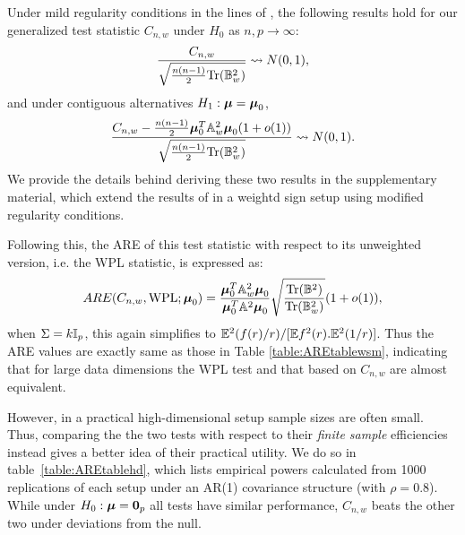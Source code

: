 Under mild regularity conditions in the lines of \cite{WangPengLi15}, the following results hold for our generalized test statistic $C_{n,w}$ under $H_0$ as $n,p \rightarrow \infty$:
%
\begin{equation}\label{eqn:hdtest1}
\frac{C_{n,w}}{\sqrt{\frac{n(n-1)}{2} \text{Tr}({\mathbb{B}}_w^2)}} \leadsto N(0,1),
\end{equation}
%
and under contiguous alternatives $H_1: {\boldsymbol{\mu}} = {\boldsymbol{\mu}}_0$,
%
\begin{equation}\label{eqn:hdtest2}
\frac{C_{n,w} - \frac{n(n-1)}{2} {\boldsymbol{\mu}}_0^T {\mathbb{A}}_w^2 {\boldsymbol{\mu}}_0 (1 + o(1)) }{\sqrt{\frac{n(n-1)}{2} \text{Tr}({\mathbb{B}}_w^2)}} \leadsto N(0,1).
\end{equation}
%
We provide the details behind deriving these two results in the supplementary material, which extend the results of \cite{WangPengLi15} in a weightd sign setup using modified regularity conditions.

Following this, the ARE of this test statistic with respect to its unweighted version, i.e. the WPL statistic, is expressed as:
%
$$
ARE(C_{n,w}, \text{WPL}; {\boldsymbol{\mu}}_0) = \frac{{\boldsymbol{\mu}}_0^T {\mathbb{A}}_w^2 {\boldsymbol{\mu}}_0}{{\boldsymbol{\mu}}_0^T {\mathbb{A}}^2 {\boldsymbol{\mu}}_0} \sqrt\frac{\text{Tr}( {\mathbb{B}}^2)}{\text{Tr}( {\mathbb{B}}_w^2)} (1 + o(1)),
$$
%
when $\Sigma = k {\mathbb{I}}_p$, this again simplifies to ${\mathbb{E}}^2(f(r)/r)/[{\mathbb{E}} f^2(r). {\mathbb{E}}^2(1/r)]$. Thus the ARE values are exactly same as those in Table \ref{table:AREtablewsm}, indicating that for large data dimensions the WPL test and that based on $C_{n,w}$ are almost equivalent.

However, in a practical high-dimensional setup sample sizes are often small. Thus, comparing the the two tests with respect to their \textit{finite sample} efficiencies instead gives a better idea of their practical utility. We do so in table~\ref{table:AREtablehd}, which lists empirical powers calculated from 1000 replications of each setup under an AR(1) covariance structure (with $\rho = 0.8$). While under $H_0: {\boldsymbol{\mu}} = {\bf 0}_p$ all tests have similar performance, $C_{n,w}$ beats the other two under deviations from the null.

